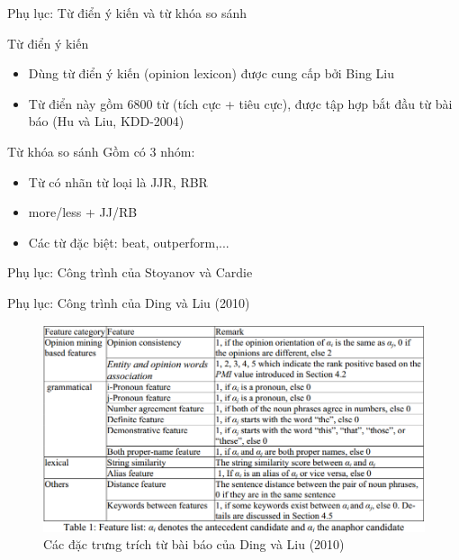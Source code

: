 \documentclass[9pt,xcolor=table,hyperref=unicode]{beamer}
\begin{document}
		\begin{frame}{Phụ lục: Từ điển ý kiến và từ khóa so sánh}
			\begin{block}{Từ điển ý kiến}
				\begin{itemize}
					\item Dùng từ điển ý kiến (opinion lexicon) được cung cấp bởi Bing Liu \footnotemark
					\item Từ điển này gồm 6800 từ (tích cực + tiêu cực), được tập hợp bắt đầu từ bài báo (Hu và Liu, KDD-2004)
				\end{itemize}
			\end{block}
			\begin{block}{Từ khóa so sánh}
				Gồm có 3 nhóm:
				\begin{itemize}
					\item Từ có nhãn từ loại là JJR, RBR
					\item more/less + JJ/RB
					\item Các từ đặc biệt: beat, outperform,...
				\end{itemize}
			\end{block}
		\end{frame}

		\begin{frame}{Phụ lục: Công trình của Stoyanov và Cardie}
		\end{frame}

		\begin{frame}{Phụ lục: Công trình của Ding và Liu (2010)}
			\begin{figure}[H]
				\centering							
				\includegraphics[scale=0.45]{images/base_features}				
				\caption{Các đặc trưng trích từ bài báo của Ding và Liu (2010)}				
			\end{figure}
		\end{frame}
\end{document}
